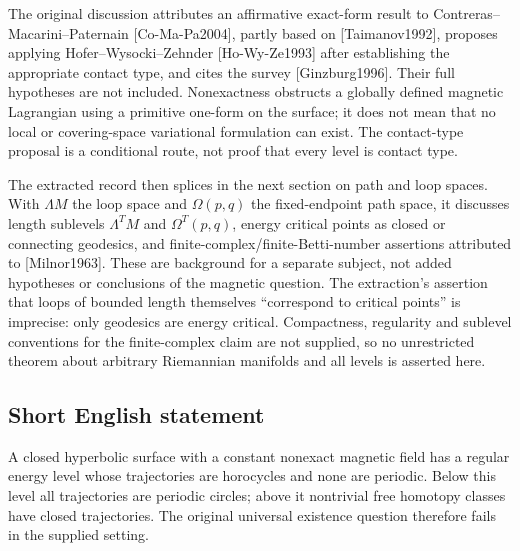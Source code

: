 \documentclass[11pt]{article}
\begin{document}
The original discussion attributes an affirmative exact-form result to Contreras--Macarini--Paternain [Co-Ma-Pa2004], partly based on [Taimanov1992], proposes applying Hofer--Wysocki--Zehnder [Ho-Wy-Ze1993] after establishing the appropriate contact type, and cites the survey [Ginzburg1996]. Their full hypotheses are not included. Nonexactness obstructs a globally defined magnetic Lagrangian using a primitive one-form on the surface; it does not mean that no local or covering-space variational formulation can exist. The contact-type proposal is a conditional route, not proof that every level is contact type.

The extracted record then splices in the next section on path and loop spaces. With \(\Lambda M\) the loop space and \(\Omega(p,q)\) the fixed-endpoint path space, it discusses length sublevels \(\Lambda^TM\) and \(\Omega^T(p,q)\), energy critical points as closed or connecting geodesics, and finite-complex/finite-Betti-number assertions attributed to [Milnor1963]. These are background for a separate subject, not added hypotheses or conclusions of the magnetic question. The extraction's assertion that loops of bounded length themselves ``correspond to critical points'' is imprecise: only geodesics are energy critical. Compactness, regularity and sublevel conventions for the finite-complex claim are not supplied, so no unrestricted theorem about arbitrary Riemannian manifolds and all levels is asserted here.
\subsection{Short English statement}
A closed hyperbolic surface with a constant nonexact magnetic field has a regular energy level whose trajectories are horocycles and none are periodic. Below this level all trajectories are periodic circles; above it nontrivial free homotopy classes have closed trajectories. The original universal existence question therefore fails in the supplied setting.
\end{document}
